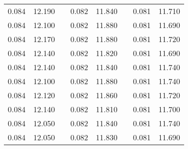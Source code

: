 \documentclass[12pt]{mwrep}
\begin{document}
\begin{table}[H]
\begin{tabularx}{\textwidth}{|Y|Y|p{2mm}|Y|Y|p{2mm}|Y|Y|}
			0.084 & 12.190 && 0.082 & 11.840 && 0.081 & 11.710 \\
			0.084 & 12.100 && 0.082 & 11.880 && 0.081 & 11.690 \\
			0.084 & 12.170 && 0.082 & 11.880 && 0.081 & 11.720 \\
			0.084 & 12.140 && 0.082 & 11.820 && 0.081 & 11.690 \\
			0.084 & 12.140 && 0.082 & 11.840 && 0.081 & 11.740 \\
			0.084 & 12.100 && 0.082 & 11.880 && 0.081 & 11.740 \\
			0.084 & 12.120 && 0.082 & 11.860 && 0.081 & 11.720 \\
			0.084 & 12.140 && 0.082 & 11.810 && 0.081 & 11.700 \\
			0.084 & 12.050 && 0.082 & 11.840 && 0.081 & 11.740 \\
			0.084 & 12.050 && 0.082 & 11.830 && 0.081 & 11.690 \\
		\end{tabularx}
	\end{table}
	
\end{document}

